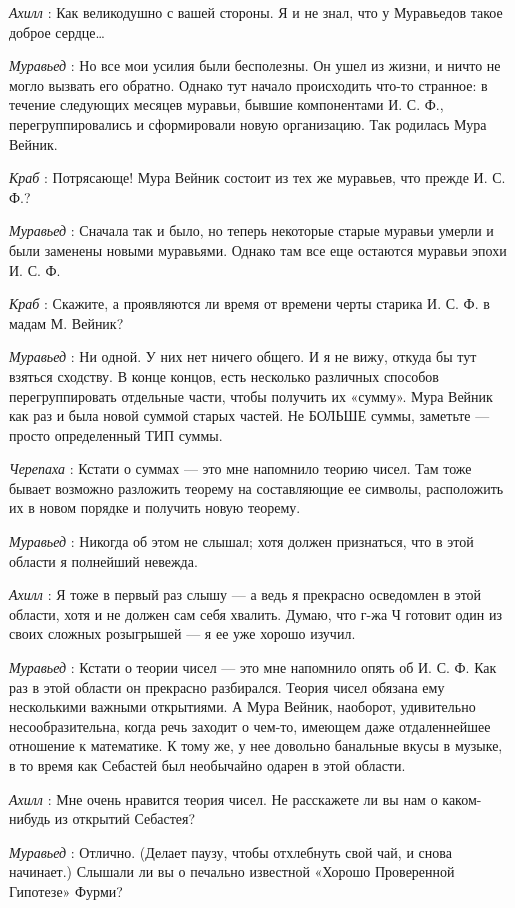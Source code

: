 \documentclass[../main.tex]{subfiles}
\begin{document}
\begin{dialogue}
\emph{Ахилл} : Как великодушно с вашей стороны. Я и не знал, что у Муравьедов такое доброе сердце\ldots{}

\emph{Муравьед} : Но все мои усилия были бесполезны. Он ушел из жизни, и ничто не могло вызвать его обратно. Однако тут начало происходить что-то странное: в течение следующих месяцев муравьи, бывшие компонентами И. С. Ф., перегруппировались и сформировали новую организацию. Так родилась Мура Вейник.

\emph{Краб} : Потрясающе! Мура Вейник состоит из тех же муравьев, что прежде И. С. Ф.?

\emph{Муравьед} : Сначала так и было, но теперь некоторые старые муравьи умерли и были заменены новыми муравьями. Однако там все еще остаются муравьи эпохи И. С. Ф.

\emph{Краб} : Скажите, а проявляются ли время от времени черты старика И. С. Ф. в мадам М. Вейник?

\emph{Муравьед} : Ни одной. У них нет ничего общего. И я не вижу, откуда бы тут взяться сходству. В конце концов, есть несколько различных способов перегруппировать отдельные части, чтобы получить их «сумму». Мура Вейник как раз и была новой суммой старых частей. Не БОЛЬШЕ суммы, заметьте --- просто определенный ТИП суммы.

\emph{Черепаха} : Кстати о суммах --- это мне напомнило теорию чисел. Там тоже бывает возможно разложить теорему на составляющие ее символы, расположить их в новом порядке и получить новую теорему.

\emph{Муравьед} : Никогда об этом не слышал; хотя должен признаться, что в этой области я полнейший невежда.

\emph{Ахилл} : Я тоже в первый раз слышу --- а ведь я прекрасно осведомлен в этой области, хотя и не должен сам себя хвалить. Думаю, что г-жа Ч готовит один из своих сложных розыгрышей --- я ее уже хорошо изучил.

\emph{Муравьед} : Кстати о теории чисел --- это мне напомнило опять об И. С. Ф. Как раз в этой области он прекрасно разбирался. Теория чисел обязана ему несколькими важными открытиями. А Мура Вейник, наоборот, удивительно несообразительна, когда речь заходит о чем-то, имеющем даже отдаленнейшее отношение к математике. К тому же, у нее довольно банальные вкусы в музыке, в то время как Себастей был необычайно одарен в этой области.

\emph{Ахилл} : Мне очень нравится теория чисел. Не расскажете ли вы нам о каком-нибудь из открытий Себастея?

\emph{Муравьед} : Отлично. (Делает паузу, чтобы отхлебнуть свой чай, и снова начинает.) Слышали ли вы о печально известной «Хорошо Проверенной Гипотезе» Фурми?


\end{dialogue}
\end{document}
